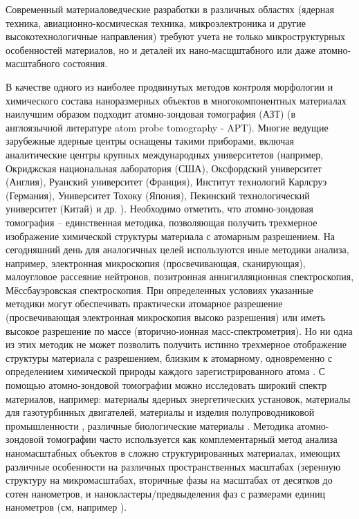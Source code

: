 
{\actuality} Современный материаловедческие разработки в различных областях (ядерная техника, авиационно-космическая техника, микроэлектроника и другие высокотехнологичные направления) требуют учета не только микроструктурных особенностей материалов, но и деталей их нано-масщштабного или даже атомно-масштабного состояния. 

В качестве одного из наиболее продвинутых методов контроля морфологии и химического состава наноразмерных объектов в многокомпонентных материалах наилучшим образом подходит атомно-зондовая томография (АЗТ) (в англоязычной литературе atom probe tomography - APT). Многие ведущие зарубежные ядерные центры оснащены такими приборами, включая аналитические центры крупных международных университетов (например, Окриджская национальная лаборатория (США), Оксфордский университет (Англия), Руанский университет (Франция), Институт технологий Карлсруэ (Германия), Университет Тохоку (Япония), Пекинский технологический университет (Китай) и др. \cite{APTlist}). Необходимо отметить, что атомно-зондовая томография – единственная методика, позволяющая получить трехмерное изображение химической структуры материала с атомарным разрешением. На сегодняшний день для аналогичных целей используются иные методики анализа, например, электронная микроскопия (просвечивающая, сканирующая), малоугловое рассеяние нейтронов, позитронная аннигилляционная спектроскопия, Мёссбауэровская спектроскопия. При определенных условиях указанные методики могут обеспечивать практически атомарное разрешение (просвечивающая электронная микроскопия высоко разрешения) или иметь высокое разрешение по массе (вторично-ионная масс-спектрометрия). Но ни одна из этих методик не может позволить получить истинно трехмерное отображение структуры материала с разрешением, близким к атомарному, одновременно с определением химической природы каждого зарегистрированного атома \cite{GaultBOOK}. С помощью атомно-зондовой томографии можно исследовать широкий спектр материалов, например: материалы ядерных энергетических установок, материалы для газотурбинных двигателей, материалы и изделия полупроводниковой промышленности \cite{Ulfig23}, различные биологические материалы \cite{Lee21}. Методика атомно-зондовой томографии часто используется как комплементарный метод анализа наномасштабных объектов в сложно структурированных материалах, имеющих различные особенности на различных пространственных масштабах (зеренную структуру на микромасштабах, вторичные фазы на масштабах от десятков до сотен нанометров, и нанокластеры/предвыделения фаз с размерами единиц нанометров (см, например \cite{Rogozhkin24}).

